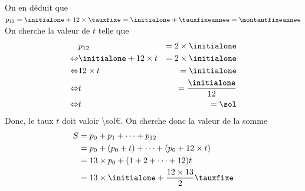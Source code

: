 \documentclass{controle}
\begin{document}
\begin{questions}
\begin{solution}
\begin{parts}
\begin{subparts}
On en déduit que $p_{12} = \initialone + 12 \times \tauxfixe = \initialone + \tauxfixeannee = \montantfixeannee$
\subpart 
{}
On cherche la valeur de $t$ telle que 
\begin{equation*}
\begin{aligned}
&p_{12} &= 2 \times \initialone\\
\Leftrightarrow& \initialone + 12 \times t &= 2 \times \initialone\\
\Leftrightarrow& 12 \times t &= \initialone\\
\Leftrightarrow& t &= \dfrac{\initialone}{12}\\
\Leftrightarrow& t &= \sol
\end{aligned}
\end{equation*}
Donc, le taux $t$ doit valoir \num{\sol}€.
\subpart On cherche donc la valeur de la somme
\begin{equation*}
\begin{aligned}
S &= p_0 + p_1 + \dots + p_{12}\\
&= p_0 + (p_0 + t) + \dots + (p_0 + 12 \times t)\\
&= 13 \times p_0 + (1 + 2 + \dots + 12)t\\
&= 13 \times \initialone + \dfrac{12 \times 13}{2} \tauxfixe\\
\end{aligned}
\end{equation*}
\end{subparts}  

\end{parts}
\end{solution}
\end{questions}
\end{document}
